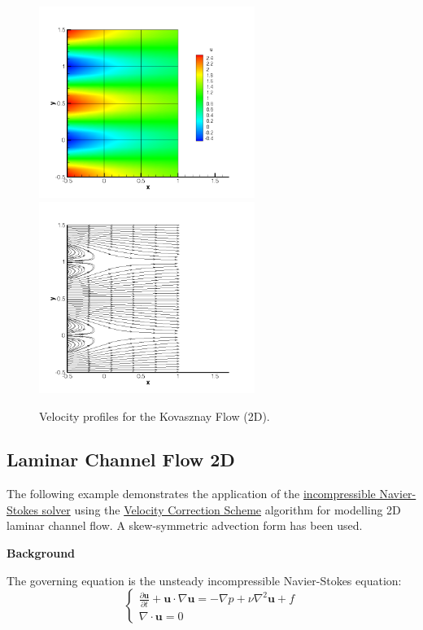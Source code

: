 \begin{figure}
\begin{center}
\includegraphics[width=7cm]{Figures/KF2DCVP8.png}
\includegraphics[width=7cm]{Figures/KF2DCVP8SL.png}
\caption{Velocity profiles for the Kovasznay Flow (2D).}
\end{center}
\end{figure}

\newpage

\subsection{Laminar Channel Flow 2D}
\label{LaminarChannelFlow2D}
The following example demonstrates the application of the \hyperref[IncNSsolver]{incompressible Navier-Stokes solver} using the \hyperref[VCSscheme]{Velocity Correction Scheme} algorithm for modelling 2D laminar channel flow. A skew-symmetric advection form has been used.

\textbf{Background}

The governing equation is the unsteady incompressible Navier-Stokes equation:
\begin{equation}
\begin{cases}
\frac{\partial \textbf{u}}{\partial t} + \textbf{u} \cdot \nabla \textbf{u} = - \nabla p + \nu \nabla^2 \textbf{u} + f \\
\nabla \cdot \textbf{u} = 0
\end{cases}
\end{equation}

